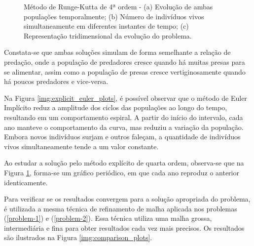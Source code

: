 \begin{figure}[H]
{	}
	\caption{Método de Runge-Kutta de 4ª ordem - (a) Evolução de ambas populações temporalmente; (b) Número de indivíduos vivos simultaneamente em diferentes instantes de tempo; (c) Representação tridimensional da evolução do problema.}
    \label{img:rk4_plots}
\end{figure}

Constata-se que ambas soluções simulam de forma semelhante a relação de predação, onde a população de predadores cresce quando há muitas presas para se alimentar, assim como a população de presas cresce vertiginosamente quando há poucos predadores e vice-versa.

Na Figura \ref{img:explicit_euler_plots}, é possível observar que o método de Euler Implícito reduz a amplitude dos ciclos das populações ao longo do tempo, resultando em um comportamento espiral. A partir do início do intervalo, cada ano manteve o comportamento da curva, mas reduziu a variação da população. Embora novos indivíduos surjam e outros faleçam, a quantidade de indivíduos vivos simultaneamente tende a um valor constante.

Ao estudar a solução pelo método explícito de quarta ordem, observa-se que na Figura \ref{img:rk4_plots}, forma-se um gráfico periódico, em que cada ano reproduz o anterior identicamente.

Para verificar se os resultados convergem para a solução apropriada do problema, é utilizada a mesma técnica de refinamento de malha aplicada nos problemas (\ref{problem-1}) e (\ref{problem-2}). Essa técnica utiliza uma malha grossa, intermediária e fina para obter resultados cada vez mais precisos. Os resultados são ilustrados na Figura \ref{img:comparison_plots}.

